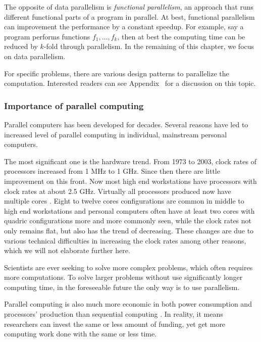 The opposite of data parallelism is \emph{functional parallelism}, an approach
that runs different functional parts of a program in parallel. At best,
functional parallelism can improvement the performance by a constant speedup.
For example, say a program performs functions $f_1,\dots,f_k$, then at best
the computing time can be reduced by $k$-fold through parallelism. In the
remaining of this chapter, we focus on data parallelism.

For specific problems, there are various design patterns to parallelize the
computation. Interested readers can see Appendix~ for a discussion on this topic.

\subsubsection{Importance of parallel computing}
\label{ssub:Importance of parallel computing}

Parallel computers has been developed for decades. Several reasons have led to
increased level of parallel computing in individual, mainstream personal
computers.

The most significant one is the hardware trend. From 1973 to 2003, clock rates
of processors increased from 1 MHz to 1 GHz. Since then there are little
improvement on this front. Now most high end workstations have processors with
clock rates at about 2.5 GHz. Virtually all processors produced now have
multiple cores \cite{parallel}. Eight to twelve cores configurations are
common in middle to high end workstations and personal computers often have at
least two cores with quadric configurations more and more commonly seen, while
the clock rates not only remains flat, but also has the trend of decreasing.
These changes are due to various technical difficulties in increasing the
clock rates among other reasons, which we will not elaborate further here.

Scientists are ever seeking to solve more complex problems, which often
requires more computations. To solve larger problems without use significantly
longer computing time, in the foreseeable future the only way is to use
parallelism.

Parallel computing is also much more economic in both power consumption and
processors' production than sequential computing \cite{parallel}. In reality,
it means researchers can invest the same or less amount of funding, yet get
more computing work done with the same or less time.

